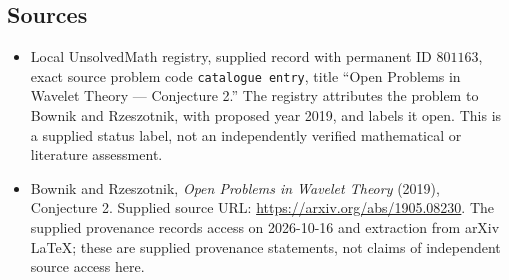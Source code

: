 \documentclass[11pt]{article}
\begin{document}
\subsection{Sources}
\begin{itemize}
\item Local UnsolvedMath registry, supplied record with permanent ID \(801163\), exact source problem code \texttt{catalogue entry}, title ``Open Problems in Wavelet Theory --- Conjecture 2.'' The registry attributes the problem to Bownik and Rzeszotnik, with proposed year 2019, and labels it open. This is a supplied status label, not an independently verified mathematical or literature assessment.
\item Bownik and Rzeszotnik, \emph{Open Problems in Wavelet Theory} (2019), Conjecture 2. Supplied source URL: \url{https://arxiv.org/abs/1905.08230}. The supplied provenance records access on 2026-10-16 and extraction from arXiv LaTeX; these are supplied provenance statements, not claims of independent source access here.
\end{itemize}
\end{document}
